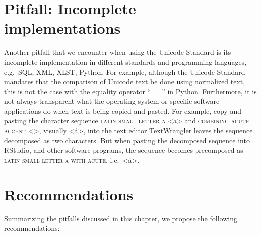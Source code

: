 \section{Pitfall: Incomplete implementations}
\label{incomplete-implementations}
Another pitfall that we encounter when using the Unicode Standard is its incomplete implementation in different standards and programming languages, e.g.\ SQL, XML, XLST, Python. For example, although the Unicode Standard mandates that the comparison of Unicode text be done using normalized text, this is not the case with the equality operator ``=='' in Python. Furthermore, it is not always transparent what the operating system or specific software applications do when text is being copied and pasted. For example, copy and pasting the character sequence  \textsc{latin small letter a} <a> and  \textsc{combining acute accent} <>, visually <á>, into the text editor TextWrangler leaves the sequence decomposed as two characters. But when pasting the decomposed sequence into RStudio, and other software programs, the sequence becomes precomposed as  \textsc{latin small letter a with acute}, i.e.\ <á>.



\section{Recommendations}
\label{recommendations}

Summarizing the pitfalls discussed in this chapter, we propose the following 
recommendations:

